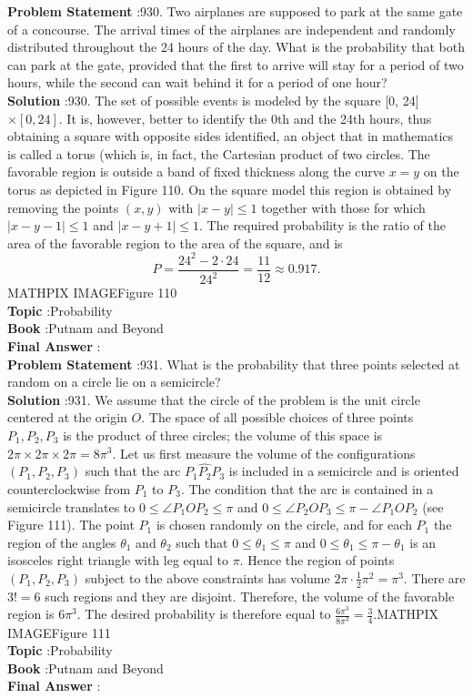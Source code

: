 \documentclass[10pt]{article}
\begin{document}
\textbf{Problem Statement} :930. Two airplanes are supposed to park at the same gate of a concourse. The arrival times of the airplanes are independent and randomly distributed throughout the 24 hours of the day. What is the probability that both can park at the gate, provided that the first to arrive will stay for a period of two hours, while the second can wait behind it for a period of one hour?\\
\textbf{Solution} :930. The set of possible events is modeled by the square [0, 24] $\times[0,24]$. It is, however, better to identify the 0th and the 24th hours, thus obtaining a square with opposite sides identified, an object that in mathematics is called a torus (which is, in fact, the Cartesian product of two circles. The favorable region is outside a band of fixed thickness along the curve $x=y$ on the torus as depicted in Figure 110. On the square model this region is obtained by removing the points $(x, y)$ with $|x-y| \leq 1$ together with those for which $|x-y-1| \leq 1$ and $|x-y+1| \leq 1$. The required probability is the ratio of the area of the favorable region to the area of the square, and is$$ P=\frac{24^{2}-2 \cdot 24}{24^{2}}=\frac{11}{12} \approx 0.917 . $$MATHPIX IMAGEFigure 110\\
\textbf{Topic} :Probability\\
\textbf{Book} :Putnam and Beyond\\
\textbf{Final Answer} :\\


\textbf{Problem Statement} :931. What is the probability that three points selected at random on a circle lie on a semicircle?\\
\textbf{Solution} :931. We assume that the circle of the problem is the unit circle centered at the origin $O$. The space of all possible choices of three points $P_{1}, P_{2}, P_{3}$ is the product of three circles; the volume of this space is $2 \pi \times 2 \pi \times 2 \pi=8 \pi^{3}$. Let us first measure the volume of the configurations $\left(P_{1}, P_{2}, P_{3}\right)$ such that the arc $P_{1} \widehat{P_{2}} P_{3}$ is included in a semicircle and is oriented counterclockwise from $P_{1}$ to $P_{3}$. The condition that the arc is contained in a semicircle translates to $0 \leq \angle P_{1} O P_{2} \leq \pi$ and $0 \leq \angle P_{2} O P_{3} \leq \pi-\angle P_{1} O P_{2}$ (see Figure 111). The point $P_{1}$ is chosen randomly on the circle, and for each $P_{1}$ the region of the angles $\theta_{1}$ and $\theta_{2}$ such that $0 \leq \theta_{1} \leq \pi$ and $0 \leq \theta_{1} \leq \pi-\theta_{1}$ is an isosceles right triangle with leg equal to $\pi$. Hence the region of points $\left(P_{1}, P_{2}, P_{3}\right)$ subject to the above constraints has volume $2 \pi \cdot \frac{1}{2} \pi^{2}=\pi^{3}$. There are $3 !=6$ such regions and they are disjoint. Therefore, the volume of the favorable region is $6 \pi^{3}$. The desired probability is therefore equal to $\frac{6 \pi^{3}}{8 \pi^{3}}=\frac{3}{4}$.MATHPIX IMAGEFigure 111\\
\textbf{Topic} :Probability\\
\textbf{Book} :Putnam and Beyond\\
\textbf{Final Answer} :\\
\end{document}
